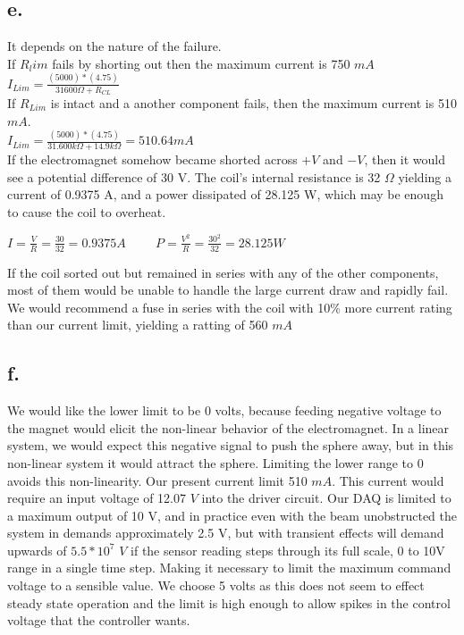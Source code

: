 \documentclass{article}
\theoremstyle{plain}
\theoremstyle{definition}
\theoremstyle{remark}
\begin{document}
\subsection*{e.}
It depends on the nature of the failure. \\
If $R_lim$ fails by shorting out then the maximum current is 750 $mA$ \\
$I_{Lim} = \frac{(5000)*(4.75)}{31600\Omega + R_{CL}} $\\
If $R_{Lim}$ is intact and a another component fails, then the maximum current is 510 $mA$. \\
$I_{Lim} = \frac{(5000)*(4.75)}{31.600k\Omega + 14.9k\Omega} =510.64mA$ \\
If the electromagnet somehow became shorted across $+V$ and $-V$, then it would see a potential difference of 30 V.  The coil's internal resistance is 32 $\Omega$ yielding a current of 0.9375 A, and a power dissipated of 28.125 W, which may be enough to cause the coil to overheat.\\
\begin{center}
$I = \frac{V}{R} = \frac{30}{32} = 0.9375 A \hspace{1cm}  P = \frac{V^{2}}{R} = \frac{30^2}{32} = 28.125 W $
\end{center}
If the coil sorted out but remained in series with any of the other components, most of them would be unable to handle the large current draw and rapidly fail.  We would recommend a fuse in series with the coil with 10\% more current rating than our current limit, yielding a ratting of 560 $mA$\\

\subsection*{f.}  We would like the lower limit to be 0 volts, because feeding negative voltage to the magnet would elicit the non-linear behavior of the electromagnet.  In a linear system, we would expect this negative signal to push the sphere away, but in this non-linear system it would attract the sphere.  Limiting the lower range to 0 avoids this non-linearity.  
Our present current limit 510 $mA$.  This current would require an input voltage of 12.07 $V$ into the driver circuit.  Our DAQ is limited to a maximum output of 10 V, and in practice even with the beam unobstructed the system in demands approximately 2.5 V, but with transient effects will demand upwards of $5.5*10^7$ $V$ if the sensor reading steps through its full scale, 0 to 10V range in a single time step. Making it necessary to limit the maximum command voltage to a sensible value.  We choose 5 volts as this does not seem to effect steady state operation and the limit is high enough to allow spikes in the control voltage that the controller wants.
\end{document}
